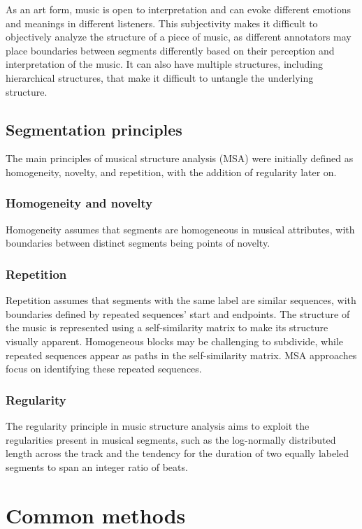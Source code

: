 As an art form, music is open to interpretation and can evoke different emotions and meanings in different listeners. This subjectivity makes it difficult to objectively analyze the structure of a piece of music, as different annotators may place boundaries between segments differently based on their perception and interpretation of the music. It can also have multiple structures, including hierarchical structures, that make it difficult to untangle the underlying structure.

\subsection{Segmentation principles}
The main principles of musical structure analysis (MSA) were initially defined as homogeneity, novelty, and repetition, with the addition of regularity later on. 

\subsubsection{Homogeneity and novelty}
Homogeneity assumes that segments are homogeneous in musical attributes, with boundaries between distinct segments being points of novelty. 

\subsubsection{Repetition}
Repetition assumes that segments with the same label are similar sequences, with boundaries defined by repeated sequences' start and endpoints. The structure of the music is represented using a self-similarity matrix to make its structure visually apparent. Homogeneous blocks may be challenging to subdivide, while repeated sequences appear as paths in the self-similarity matrix. MSA approaches focus on identifying these repeated sequences.

\subsubsection{Regularity}
The regularity principle in music structure analysis aims to exploit the regularities present in musical segments, such as the log-normally distributed length across the track and the tendency for the duration of two equally labeled segments to span an integer ratio of beats.

\section{Common methods}


